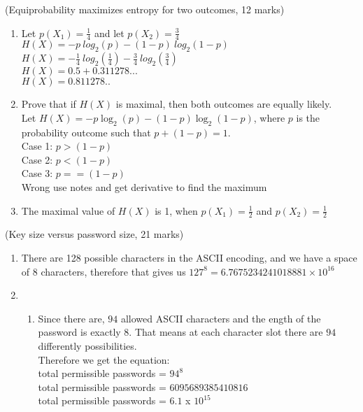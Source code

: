 \documentclass{assignment}
\begin{document}
\begin{problemlist}
\pbitem (Equiprobability maximizes entropy for two outcomes, 12 marks)
\begin{problem}
\begin{answer}
\begin{enumerate}[label=(\alph*)]
	\item	Let $ p(X_1) = \frac{1}{4} $ and let $ p(X_2) = \frac{3}{4} $	\\
			$H(X) = -p \ log_2(p) -(1-p) \ log_2(1-p) $ \\
			$H(X) = -\frac{1}{4} \ log_2(\frac{1}{4}) -\frac{3}{4} \ log_2(\frac{3}{4}) $ \\
			$H(X) = 0.5 + 0.311278...$ \\
			$H(X) = 0.811278.. $
			
	\item 	Prove that if $H(X)$ is maximal, then both outcomes are equally likely. \\
			Let $H(X) = -p \log_2 (p) - (1-p) \log_2 (1-p)$, where $p$ is the probability 
			outcome such that $p + (1-p) = 1$. \\
			Case 1: $ p > (1- p) $\\
			Case 2: $ p < (1- p) $\\
			Case 3: $ p == (1- p) $\\
			Wrong use notes and get derivative to find the maximum
		
			
	\item 	The maximal value of $H(X)$ is 1, when $p(X_1) = \frac{1}{2}$ and $p(X_2) = \frac{1}{2}$
\end{enumerate}
\end{answer}
\end{problem}

\clearpage

\pbitem (Key size versus password size, 21 marks)
\begin{problem}
\begin{answer}
\begin{enumerate}[label=(\alph*)]
	\item	There are 128 possible characters in the ASCII encoding, and we have a space of 8 characters, therefore that gives us $127^8 = 6.7675234241018881 × 10^{16}$
	\item 	\begin{enumerate}[label=(\roman*)]
			\item Since there are, $94$ allowed ASCII characters and the ength of the password is exactly $8$. That means at each character slot there are $94$ differently possibilities.\\
			Therefore we get the equation:\\
				total permissible passwords = $94^8$ \\
				total permissible passwords = $6095689385410816$ \\
				total permissible passwords = $6.1$ x $10^{15}$ \\
			

\end{enumerate}
\end{enumerate}
\end{answer}
\end{problem}
\end{problemlist}
\end{document}
